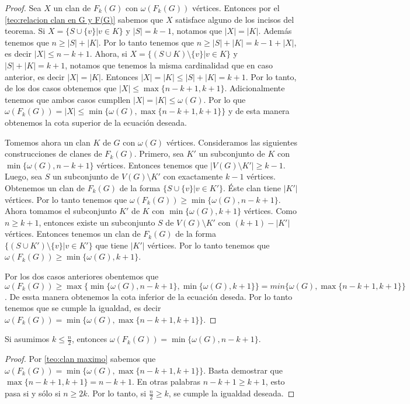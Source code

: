     \begin{proof}
        Sea $X$ un clan de $F_k(G)$ con $\omega(F_k(G))$ v\'ertices. Entonces
        por el \cref{teo:relacion clan en G y F(G)} sabemos que $X$ satisface alguno de los incisos
        del teorema. Si $X = \{S \cup \{v\}| v \in K\}$ y $|S| = k-1$, notamos
        que $|X| = |K|$. Adem\'as tenemos que $n \geq |S| + |K|$. Por lo tanto
        tenemos que $n \geq |S| + |K| = k-1 + |X|$, es decir $|X| \leq n-k+1$.
        Ahora, si $X = \{(S\cup K) \setminus \{v\}| v \in K \}$ y $|S| + |K| =
        k+1$, notamos que tenemos la misma cardinalidad que en caso anterior, es
        decir $|X| =|K|$. Entonces $|X| = |K| \leq |S| + |K| = k+1$. Por lo
        tanto, de los dos casos obtenemos que $|X| \leq \max\{n-k+1, k+1\}$.
        Adicionalmente tenemos que ambos casos cumpllen $|X| = |K| \leq
        \omega(G)$. Por lo que $\omega(F_k(G)) = |X| \leq \min \{\omega(G), \max
        \{n-k+1, k+1\}\}$ y de esta manera obtenemos la cota superior de la
        ecuaci\'on deseada.

        Tomemos ahora un clan $K$ de $G$ con $\omega(G)$ v\'ertices.
        Consideramos las siguientes construcciones de clanes de $F_k(G)$.
        Primero, sea $K'$ un subconjunto de $K$ con $\min\{\omega(G),n-k+1\}$
        v\'ertices. Entonces tenemos que $|V(G) \setminus K'| \geq k-1$. Luego,
        sea $S$ un subconjunto de $V(G) \setminus K'$ con exactamente $k-1$
        v\'ertices. Obtenemos un clan de $F_k(G)$ de la forma $\{ S \cup \{v\}|v
        \in K'\}$. \'Este clan tiene $|K'|$ v\'ertices. Por lo tanto tenemos que
        $\omega(F_k(G)) \geq \min \{\omega(G), n-k+1\}$. Ahora tomamos el
        subconjunto $K'$ de $K$ con $\min \{ \omega(G), k+1\}$ v\'ertices. Como
        $n \geq k+1$, entonces existe un subconjunto $S$ de $V(G) \setminus K'$
        con $(k+1)-|K'|$ v\'ertices. Entonces tenemos un clan de $F_k(G)$ de la
        forma $\{ (S \cup K') \setminus \{v\}|v \in K'\}$ que tiene $|K'|$
        v\'ertices. Por lo tanto tenemos que $\omega(F_k(G)) \geq \min
        \{\omega(G), k+1\}$.

        Por los dos casos anteriores obentemos que $\omega(F_k(G)) \geq \max
        \{\min \{\omega(G), n-k+1\}, \min \{\omega(G), k+1 \}\} = min \{\omega(G),
        \max \{n-k+1,k+1\}\}$. De essta manera obtenemos la cota inferior de la
        ecuaci\'on deseda. Por lo tanto tenemos que se cumple la igualdad, es
        decir  $\omega(F_k(G))= \min \{\omega(G), \max \{n-k+1,k+1\}\}$.
    \end{proof}

    \begin{corolario}
        Si asumimos $k \leq \frac{n}{2}$, entonces $\omega(F_k(G))= \min
        \{\omega(G), n-k+1\}$.
    \end{corolario}

    \begin{proof}
        Por \cref{teo:clan maximo} sabemos que $\omega(F_k(G))= \min
        \{\omega(G), \max \{n-k+1,k+1\}\}$. Basta demostrar que $\max \{n-k+1,
        k+1\} = n-k+1$. En otras palabras $n-k+1 \geq k+1$, esto pasa si y
        s\'olo si $n \geq 2k$. Por lo tanto, si $\frac{n}{2} \geq k$, se cumple
        la igualdad deseada.
    \end{proof}